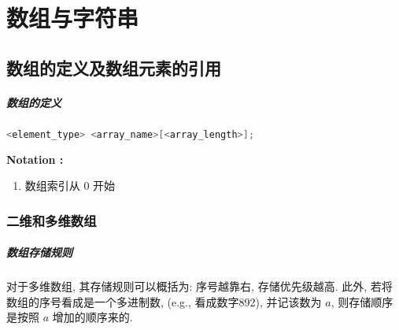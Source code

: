 \chapter{数组与字符串}
\section{数组的定义及数组元素的引用}
    \paragraph{数组的定义}
        \begin{lstlisting}[language = {C}, gobble = 12]
            <element_type> <array_name>[<array_length>];
        \end{lstlisting}
    \textbf{Notation :}
    \begin{enumerate}
        \item 数组索引从 0 开始
    \end{enumerate}

    \subsection{二维和多维数组}
    \paragraph{数组存储规则}
        对于多维数组, 其存储规则可以概括为: 序号越靠右, 存储优先级越高. 此外, 若将数组的序号看成是一个多进制数, (e.g., \Code{[8][9][2]} 看成数字892), 并记该数为 $a$, 则存储顺序是按照 $a$ 增加的顺序来的.
